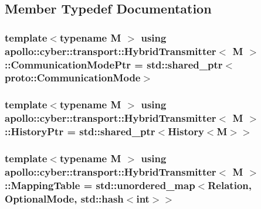 \subsection{Member Typedef Documentation}
\hypertarget{classapollo_1_1cyber_1_1transport_1_1HybridTransmitter_aebca8e1bc93bfde3563c0c8b8c92bfa9}{
\subsubsection[{Communication\-Mode\-Ptr}]{\setlength{\rightskip}{0pt plus 5cm}template$<$typename M $>$ using {\bf apollo\-::cyber\-::transport\-::\-Hybrid\-Transmitter}$<$ M $>$\-::{\bf Communication\-Mode\-Ptr} =  std\-::shared\-\_\-ptr$<$proto\-::\-Communication\-Mode$>$}}\label{classapollo_1_1cyber_1_1transport_1_1HybridTransmitter_aebca8e1bc93bfde3563c0c8b8c92bfa9}
\hypertarget{classapollo_1_1cyber_1_1transport_1_1HybridTransmitter_aee5ef32dcbaab6fcd68459e5f5afd6d8}{
\subsubsection[{History\-Ptr}]{\setlength{\rightskip}{0pt plus 5cm}template$<$typename M $>$ using {\bf apollo\-::cyber\-::transport\-::\-Hybrid\-Transmitter}$<$ M $>$\-::{\bf History\-Ptr} =  std\-::shared\-\_\-ptr$<${\bf History}$<$M$>$$>$}}\label{classapollo_1_1cyber_1_1transport_1_1HybridTransmitter_aee5ef32dcbaab6fcd68459e5f5afd6d8}
\hypertarget{classapollo_1_1cyber_1_1transport_1_1HybridTransmitter_a7073fcd5fe2232785a883a3f494d00ed}{
\subsubsection[{Mapping\-Table}]{\setlength{\rightskip}{0pt plus 5cm}template$<$typename M $>$ using {\bf apollo\-::cyber\-::transport\-::\-Hybrid\-Transmitter}$<$ M $>$\-::{\bf Mapping\-Table} =  std\-::unordered\-\_\-map$<${\bf Relation}, Optional\-Mode, std\-::hash$<$int$>$$>$}}\label{classapollo_1_1cyber_1_1transport_1_1HybridTransmitter_a7073fcd5fe2232785a883a3f494d00ed}
